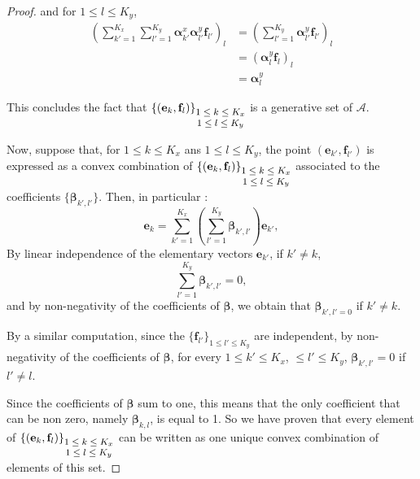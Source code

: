 \documentclass{article}
\def\cA{\mathcal{A}}
\def\aalpha{\boldsymbol{\alpha}}
\def\bbeta{\boldsymbol{\beta}}
\def\bbeta{\boldsymbol{\beta}}
\def\ee{\mathbf{e}}
\def\ff{\mathbf{f}}
\begin{document}
\begin{proof}
and for $1 \leq l \leq K_y$, 
\begin{equation}
    \begin{array}{ll}
       \displaystyle{}   \left(\sum_{k' = 1}^{K_x} \sum_{l' = 1}^{K_y} \aalpha_{k'}^x \aalpha_{l'}^y  \ff_{l'}\right)_{l} & = 
        \displaystyle{}  \left(\sum_{l' = 1}^{K_y} \aalpha_{l'}^y \ff_{l'} \right)_{l}\\
         &\displaystyle{} = ( \aalpha_{l}^y \ff_{l})_{l} \\
         &\displaystyle{} = \aalpha^y_{l}
    \end{array}
\end{equation}

This concludes the fact that $\left\lbrace \left( \ee_{k}, \ff_{l}\right) \right\rbrace_{\footnotesize \begin{matrix} 1 \leq k \leq K_x \\ 1\leq l \leq K_y \end{matrix}}$ is a generative set of $\cA$.

Now, suppose that, for $1\leq k \leq K_x$ ans $1\leq l \leq K_y$, the point $\displaystyle{} (\ee_{k'}, \ff_{l'})$ is expressed as a convex combination of $\left\lbrace \left( \ee_{k}, \ff_{l}\right) \right\rbrace_{\footnotesize \begin{matrix} 1 \leq k \leq K_x \\ 1\leq l \leq K_y \end{matrix}}$ associated to the coefficients $\{ \bbeta_{k', l'}\}$. Then, in particular :
%
\begin{equation}
    \ee_{k} = \sum_{k' =1}^{K_x} \left( \sum_{l' =1}^{K_y} \bbeta_{k', l'} \right) \ee_{k'},
\end{equation}
%
By linear independence of the elementary vectors $\ee_{k'}$, if $k' \neq k$,
%
 \begin{equation}
     \sum_{l' = 1}^{K_y} \bbeta_{k', l'} = 0,
 \end{equation}
and by non-negativity of the coefficients of $\bbeta$, we obtain that $\bbeta_{k', l' = 0}$ if $k' \neq k$.

By a similar computation, since the $\{\ff_{l'}\}_{1 \leq l'\leq K_y}$ are independent, by non-negativity of the coefficients of $\bbeta$, for every $1\leq k' \leq K_x$, $\leq l' \leq K_y$, $\bbeta_{k', l'} = 0$ if $l' \neq l$. 

Since the coefficients of $\bbeta$ sum to one, this means that the only coefficient that can be non zero, namely $\bbeta_{k,l}$, is equal to 1. So we have proven that every  element of $\left\lbrace \left( \ee_{k}, \ff_{l}\right) \right\rbrace_{\footnotesize \begin{matrix} 1 \leq k \leq K_x \\ 1\leq l \leq K_y \end{matrix}}$ can be written as one unique convex combination of elements of this set.
\end{proof}
%
\end{document}
